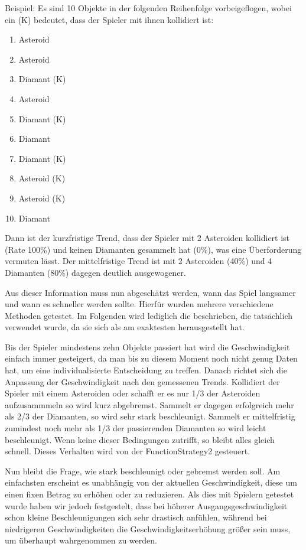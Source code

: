 \documentclass[a4paper,12pt]{scrartcl}
\begin{document}
Beispiel: Es sind 10 Objekte in der folgenden Reihenfolge vorbeigeflogen, wobei ein (K)
bedeutet, dass der Spieler mit ihnen kollidiert ist:
\begin{enumerate}
\item Asteroid
\item Asteroid
\item Diamant (K)
\item Asteroid
\item Diamant (K)
\item Diamant
\item Diamant (K)
\item Asteroid (K)
\item Asteroid (K)
\item Diamant
\end{enumerate}
Dann ist der kurzfristige Trend, dass der Spieler mit 2 Asteroiden kollidiert
ist (Rate 100\%) und keinen Diamanten gesammelt hat (0\%), was eine Überforderung vermuten lässt.
Der mittelfristige Trend ist mit 2 Asteroiden (40\%) und 4 Diamanten (80\%)
dagegen deutlich ausgewogener.

Aus dieser Information muss nun abgeschätzt werden, wann das Spiel langsamer und wann
es schneller werden sollte. Hierfür wurden mehrere verschiedene Methoden getestet. Im
Folgenden wird lediglich die beschrieben, die tatsächlich verwendet wurde, da sie sich als
am exaktesten herausgestellt hat.

Bis der Spieler mindestens zehn Objekte passiert hat wird die Geschwindigkeit einfach
immer gesteigert, da man bis zu diesem Moment noch nicht genug Daten hat, um
eine individualisierte Entscheidung zu treffen. Danach richtet sich die Anpassung der
Geschwindigkeit nach den gemessenen Trends. Kollidiert der Spieler mit einem Asteroiden
oder schafft er es nur 1/3 der Asteroiden aufzusammmeln so wird kurz abgebremst.
Sammelt er dagegen erfolgreich mehr als 2/3 der Diamanten, so wird sehr stark
beschleunigt. Sammelt er mittelfristig zumindest noch mehr als 1/3 der
passierenden Diamanten so wird leicht beschleunigt. Wenn keine dieser Bedingungen zutrifft, so bleibt alles gleich schnell. Dieses Verhalten wird von der FunctionStrategy2 gesteuert.

Nun bleibt die Frage, wie stark beschleunigt oder gebremst werden soll. Am einfachsten
erscheint es unabhängig von der aktuellen Geschwindigkeit, diese um einen fixen Betrag
zu erhöhen oder zu reduzieren. Als dies mit Spielern getestet wurde haben wir jedoch
festgestelt, dass bei höherer Ausgangsgeschwindigkeit schon kleine Beschleunigungen
sich sehr drastisch anfühlen, während bei niedrigeren Geschwindigkeiten die
Geschwindigkeitserhöhung größer sein muss, um überhaupt wahrgenommen zu werden.
\end{document}
